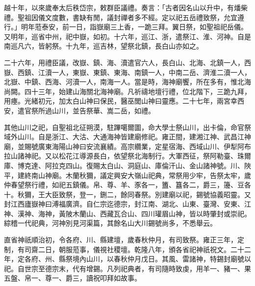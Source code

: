 \begin{pinyinscope}
越十年，以來歲奉太后秩岱宗，敕群臣議禮。奏言：「古者因名山以升中，有燔柴禮。聖祖因儀文度數，書缺有閒，議封禪者多不經。定以祀五岳禮致祭，允宜遵行。」明年蒞泰安，前一日，詣嶽廟三上香，一跪三拜。翼日祭，如聖祖祀岳儀。又明年，巡省中州，祀中嶽，如初。十六年，巡江、浙，遣祭江、淮、河神。自是南巡凡六，皆躬祭。十九年，巡吉林，望祭北鎮，長白山亦如之。

二十六年，用禮臣議，改嶽、鎮、海、瀆遣官六人，長白山、北海、北鎮一人，西嶽、西鎮、江瀆一人，東嶽、東鎮、東海、南鎮一人，中南二岳、濟淮二瀆一人，北嶽、中鎮、西海、河瀆一人，南海一人。當是時，海神廟饗，所在多有，惟北海尚闕。四十三年，始建山海關北海神廟。凡祈禱地壇行禮，位北階下，三跪九拜，用瘞。光緒初元，加太白山神曰保民，醫巫閭山神曰靈應。二十七年，兩宮幸西安，遣官祭所過山川，並告祭華、嵩二岳，如禮。

其他山川之祀，自聖祖北征朔漠，駐蹕噶爾圖，命大學士祭山川，出卡倫，命官祭域外山川。自是浙江、大沽、大通海神皆建廟修祀。雍正間，建湘江神、武昌江神廟，並賜號廣東海陽山神曰安流襄績。高宗纘業，定星宿海、西域山川、伊犁阿布拉山諸神祀。又以松花江導源長白，依望祭北海制行。大軍西征，祭阿勒臺、珠爾庫、博克達、阿拉克四山。復賜太白山、洞庭山、庫倫汗山、金山諸神號。川、陜平，建終南山神廟。木蘭秋獮，議定興安大嶺山祀典，常祭用少牢，告祭太牢，歲仲春望祭行禮，如祀五鎮儀。帛、尊、羊、豕各一，簠、簋各二，爵三，籩、豆各十。秋獮，王大臣致祭，登一，鉶二，餘同春祭。別建廟以祀，錫號協義昭靈。又封江西廬嶽神曰溥福廣濟。自仁宗迄德宗，封江南、湖北、山東、臺灣、安東、江神、漢神、海神，黃陂木蘭山、西藏瓦合山、四川瓘眉山神，皆以時肇封或崇祀。綜稽一代祀典，河神別見河渠篇，其餘名山大川錫號尚多，不悉舉云。

直省神祇順治初，令各府、川、縣建壇，歲春秋仲月，有司致祭。雍正三年，定制，有司齋二日，朝服蒞事，儀視社稷壇。乾隆八年，頒各省祀神祇祝文。二十二年，定各府、州、縣祭境內山川，以春秋仲月戊日。其風、雷諸神，特錫封廟號以祀。自世宗至德宗末，代有增錫。凡列祀典者，有司隨時致虔，用羊一、豬一、果五盤、帛一、尊一、爵三，讀祝叩拜如故事。


\end{pinyinscope}